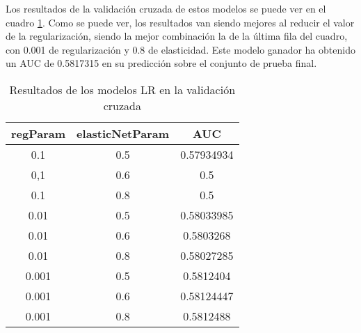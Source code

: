 Los resultados de la validación cruzada de estos modelos se puede ver en el
cuadro \ref{tab:validation-lr}. Como se puede ver, los resultados van siendo
mejores al reducir el valor de la regularización, siendo la mejor combinación la
de la última fila del cuadro, con 0.001 de regularización y 0.8 de elasticidad.
Este modelo ganador ha obtenido un AUC de 0.5817315 en su predicción sobre el
conjunto de prueba final.

\begin{table}[h!]
    \caption{Resultados de los modelos LR en la validación cruzada}
    \label{tab:validation-lr}
    \begin{center}
        \begin{tabular}{ |c|c|c| }
            \hline
            \textbf{regParam} & \textbf{elasticNetParam} & \textbf{AUC} \\
            \hline
            0.1               & 0.5                      & 0.57934934   \\
            \hline
            0,1               & 0.6                      & 0.5          \\
            \hline
            0.1               & 0.8                      & 0.5          \\
            \hline
            0.01              & 0.5                      & 0.58033985   \\
            \hline
            0.01              & 0.6                      & 0.5803268    \\
            \hline
            0.01              & 0.8                      & 0.58027285   \\
            \hline
            0.001             & 0.5                      & 0.5812404    \\
            \hline
            0.001             & 0.6                      & 0.58124447   \\
            \hline
            0.001             & 0.8                      & 0.5812488    \\
            \hline
        \end{tabular}
    \end{center}
\end{table}
